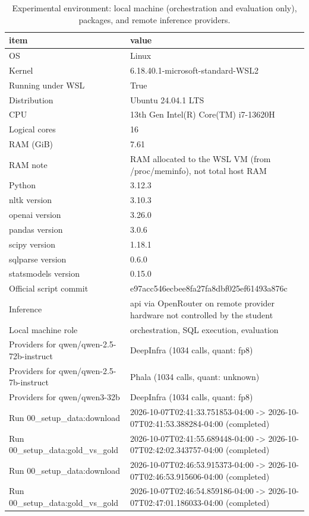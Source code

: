 \begin{table}[htbp]
\caption{Experimental environment: local machine (orchestration and evaluation only), packages, and remote inference providers.}
\label{tab:task1_environment}
\begin{tabular}{ll}
\toprule
item & value \\
\midrule
OS & Linux \\
Kernel & 6.18.40.1-microsoft-standard-WSL2 \\
Running under WSL & True \\
Distribution & Ubuntu 24.04.1 LTS \\
CPU & 13th Gen Intel(R) Core(TM) i7-13620H \\
Logical cores & 16 \\
RAM (GiB) & 7.61 \\
RAM note & RAM allocated to the WSL VM (from /proc/meminfo), not total host RAM \\
Python & 3.12.3 \\
nltk version & 3.10.3 \\
openai version & 3.26.0 \\
pandas version & 3.0.6 \\
scipy version & 1.18.1 \\
sqlparse version & 0.6.0 \\
statsmodels version & 0.15.0 \\
Official script commit & e97acc546ecbee8fa27fa8dbf025ef61493a876c \\
Inference & api via OpenRouter on remote provider hardware not controlled by the student \\
Local machine role & orchestration, SQL execution, evaluation \\
Providers for qwen/qwen-2.5-72b-instruct & DeepInfra (1034 calls, quant: fp8) \\
Providers for qwen/qwen-2.5-7b-instruct & Phala (1034 calls, quant: unknown) \\
Providers for qwen/qwen3-32b & DeepInfra (1034 calls, quant: fp8) \\
Run 00_setup_data:download & 2026-10-07T02:41:33.751853-04:00 -> 2026-10-07T02:41:53.388284-04:00 (completed) \\
Run 00_setup_data:gold_vs_gold & 2026-10-07T02:41:55.689448-04:00 -> 2026-10-07T02:42:02.343757-04:00 (completed) \\
Run 00_setup_data:download & 2026-10-07T02:46:53.915373-04:00 -> 2026-10-07T02:46:53.915606-04:00 (completed) \\
Run 00_setup_data:gold_vs_gold & 2026-10-07T02:46:54.859186-04:00 -> 2026-10-07T02:47:01.186033-04:00 (completed) \\

\end{tabular}
\end{table}
